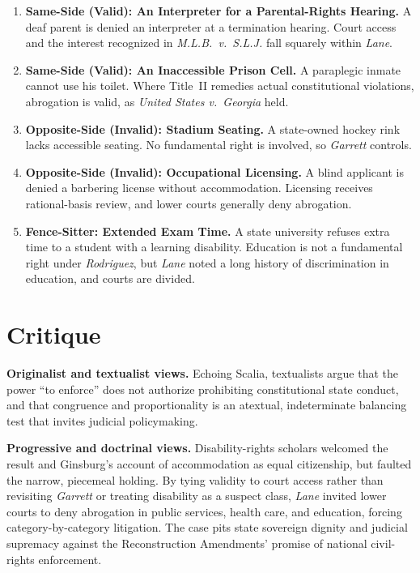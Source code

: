 \documentclass[12pt]{article}
\begin{document}
\begin{enumerate}
\item \textbf{Same-Side (Valid): An Interpreter for a Parental-Rights Hearing.} A deaf parent is denied an interpreter at a termination hearing. Court access and the interest recognized in \textit{M.L.B.\ v.\ S.L.J.} fall squarely within \textit{Lane}.
\item \textbf{Same-Side (Valid): An Inaccessible Prison Cell.} A paraplegic inmate cannot use his toilet. Where Title~II remedies actual constitutional violations, abrogation is valid, as \textit{United States v.\ Georgia} held.
\item \textbf{Opposite-Side (Invalid): Stadium Seating.} A state-owned hockey rink lacks accessible seating. No fundamental right is involved, so \textit{Garrett} controls.
\item \textbf{Opposite-Side (Invalid): Occupational Licensing.} A blind applicant is denied a barbering license without accommodation. Licensing receives rational-basis review, and lower courts generally deny abrogation.
\item \textbf{Fence-Sitter: Extended Exam Time.} A state university refuses extra time to a student with a learning disability. Education is not a fundamental right under \textit{Rodriguez}, but \textit{Lane} noted a long history of discrimination in education, and courts are divided.
\end{enumerate}

\section{Critique}

\textbf{Originalist and textualist views.} Echoing Scalia, textualists argue that the power ``to enforce'' does not authorize prohibiting constitutional state conduct, and that congruence and proportionality is an atextual, indeterminate balancing test that invites judicial policymaking.

\textbf{Progressive and doctrinal views.} Disability-rights scholars welcomed the result and Ginsburg's account of accommodation as equal citizenship, but faulted the narrow, piecemeal holding. By tying validity to court access rather than revisiting \textit{Garrett} or treating disability as a suspect class, \textit{Lane} invited lower courts to deny abrogation in public services, health care, and education, forcing category-by-category litigation. The case pits state sovereign dignity and judicial supremacy against the Reconstruction Amendments' promise of national civil-rights enforcement.
\end{document}

